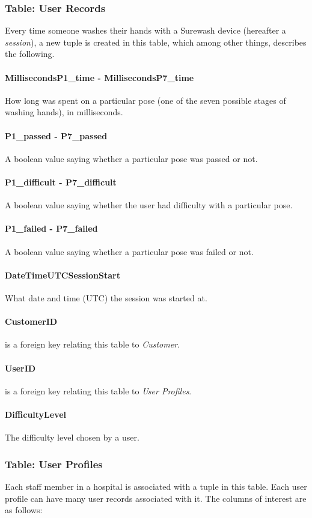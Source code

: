         \subsubsection{Table: User Records} Every time someone washes their hands with a Surewash device (hereafter a {\slshape session}), a new tuple is created in this table, which among other things, describes the following.
            \paragraph{MillisecondsP1\_time - MillisecondsP7\_time} How long was spent on a particular pose (one of the seven possible stages of washing hands), in milliseconds.
            \paragraph{P1\_passed - P7\_passed} A boolean value saying whether a particular pose was passed or not.
            \paragraph{P1\_difficult - P7\_difficult} A boolean value saying whether the user had difficulty with a particular pose.
            \paragraph{P1\_failed - P7\_failed} A boolean value saying whether a particular pose was failed or not.
            \paragraph{DateTimeUTCSessionStart} What date and time (UTC) the session was started at.
            \paragraph{CustomerID} is a foreign key relating this table to {\slshape Customer}.
            \paragraph{UserID} is a foreign key relating this table to {\slshape User Profiles}.
            \paragraph{DifficultyLevel} The difficulty level chosen by a user.
        \subsubsection{Table: User Profiles} Each staff member in a hospital is associated with a tuple in this table. Each user profile can have many user records associated with it. The columns of interest are as follows:
